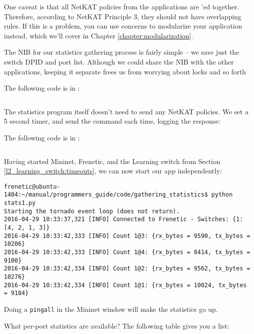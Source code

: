One caveat is that all NetKAT policies from the applications are 'ed together.  
Therefore, according
to NetKAT Principle 3, they should not have overlapping rules.  If this is a problem, you can use 
concerns to modularize your application instead, which we'll cover in Chapter \ref{chapter:modularization}.

The NIB for our statistics gathering process is fairly simple -- we save just the switch DPID and 
port list.  Although we could share the NIB with the other applications, keeping it separate frees us
from worrying about locks and so forth

The following code is in :

\inputminted{python}{code/gathering_statistics/network_information_base.py}

The statistics program itself doesn't need to send any NetKAT policies.  We set a 5 second timer,
and send the  command each time, logging the response:

The following code is in :

\inputminted{python}{code/gathering_statistics/stats1.py}

Having started Mininet, Frenetic, and the Learning switch  from Section 
\ref{l2_learning_switch:timeouts}, we can now start our app independently:

\begin{verbatim}
frenetic@ubuntu-1404:~/manual/programmers_guide/code/gathering_statistics$ python stats1.py
Starting the tornado event loop (does not return).
2016-04-29 10:33:37,321 [INFO] Connected to Frenetic - Switches: {1: [4, 2, 1, 3]}
2016-04-29 10:33:42,333 [INFO] Count 1@3: {rx_bytes = 9590, tx_bytes = 10206}
2016-04-29 10:33:42,333 [INFO] Count 1@4: {rx_bytes = 8414, tx_bytes = 9100}
2016-04-29 10:33:42,334 [INFO] Count 1@2: {rx_bytes = 9562, tx_bytes = 10276}
2016-04-29 10:33:42,334 [INFO] Count 1@1: {rx_bytes = 10024, tx_bytes = 9184}
\end{verbatim}

Doing a \texttt{pingall} in the Mininet window will make the statistics go up.

What per-port statistics are available?  The following table gives you a list:

